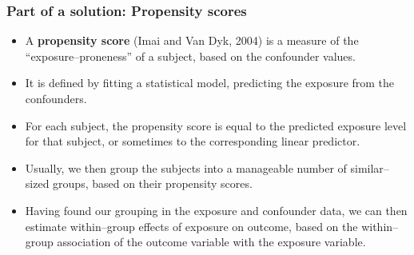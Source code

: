 \documentclass[11pt]{beamer}
\begin{document}
\begin{frame}
\frametitle{Part of a solution: Propensity scores}

\begin{itemize}

\item<2-> A \textbf{propensity score} (Imai and Van Dyk, 2004\cite{imai2004})
is a measure of the ``exposure--proneness'' of a subject,
based on the confounder values.

\item<3-> It is defined by fitting a statistical model, predicting the exposure from the confounders.

\item<4-> For each subject, the propensity score is equal to the predicted exposure level for that subject,
or sometimes to the corresponding linear predictor.

\item<5-> Usually, we then group the subjects into a manageable number of similar--sized groups,
based on their propensity scores.

\item<6-> Having found our grouping in the exposure and confounder data, we can then estimate within--group effects of exposure on outcome,
based on the within--group association of the outcome variable with the exposure variable.

\end{itemize}

\end{frame}
\end{document}
